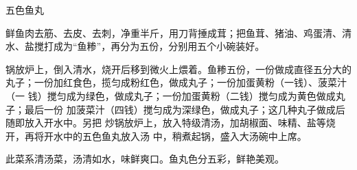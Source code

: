 \begin{recipe}[五福鱼丸]{五色鱼丸}

\ingredients


\preparation

\step 鲜鱼肉去筋、去皮、去刺，净重半斤，用刀背捶成茸；把鱼茸、猪油、鸡蛋清、清
水、盐搅打成为“鱼糁”，再分为五份，分别用五个小碗装好。

\step 锅放炉上，倒入清水，烧开后移到微火上煨着。鱼糁五份，一份做成直径五分大的
丸子；一份加红食色，揽匀成粉红色，做成丸子；一份加蛋黄粉（一钱）、菠菜汁（一
钱）搅匀成为绿色，做成丸子；一份加蛋黄粉（二钱）搅匀成为黄色做成丸子；最后一份
加菠菜汁（四钱）搅匀成为深绿色，做成丸子；这几种丸子做成后随即放入开水中。另把
炒锅放炉上，放入特级清汤，加胡椒面、味精、盐等烧开，再将开水中的五色鱼丸放入汤
中，稍煮起锅，盛入大汤碗中上席。

\features

此菜系清汤菜，汤清如水，味鲜爽口。鱼丸色分五彩，鲜艳美观。

\end{recipe}

